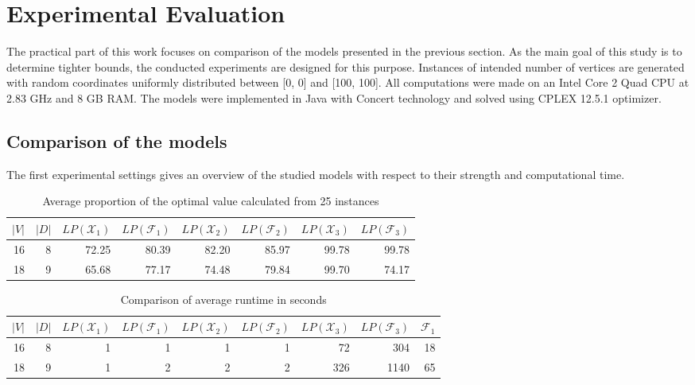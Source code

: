 \section{Experimental Evaluation}
\label{sec:exp}

The practical part of this work focuses on comparison of the models presented in the previous section.
As the main goal of this study is to determine tighter bounds, the conducted experiments are designed for this purpose.
Instances of intended number of vertices are generated with random coordinates uniformly distributed between [0, 0] and [100, 100].
All computations were made on an Intel Core 2 Quad CPU at 2.83 GHz and 8 GB RAM.
The models were implemented in Java with Concert technology and solved using CPLEX 12.5.1 optimizer.
 
\subsection{Comparison of the models}

The first experimental settings gives an overview of the studied models with respect to their strength and computational time.

\begin{table}[h!]
\centering
\setlength{\tabcolsep}{6pt} %
\renewcommand{\arraystretch}{1.4} %
\begin{tabular}{rrrrrrrr}
$|V|$ & $|D|$ & $LP(\mathcal{X}_1)$ & $LP(\mathcal{F}_1)$ & $LP(\mathcal{X}_2)$ & $LP(\mathcal{F}_2)$ & $LP(\mathcal{X}_3)$ &$LP(\mathcal{F}_3)$\\\hline
  16 & 8       & 72.25  & 80.39  & 82.20    & 85.97    & 99.78  & 99.78\\
  18 & 9       & 65.68  & 77.17  & 74.48    & 79.84    & 99.70  & 74.17\\ 
\end{tabular}
\caption{Average proportion of the optimal value calculated from 25 instances}
\label{tab:small_inst_cost}
\end{table}

\begin{table}[h!]
\centering
\setlength{\tabcolsep}{6pt} %
\renewcommand{\arraystretch}{1.4} %
\begin{tabular}{rrrrrrrrr}
 $|V|$ & $|D|$ & $LP(\mathcal{X}_1)$ & $LP(\mathcal{F}_1)$ & $LP(\mathcal{X}_2)$ & $LP(\mathcal{F}_2)$ & $LP(\mathcal{X}_3)$ & $LP(\mathcal{F}_3)$ & $\mathcal{F}_1$\\ \hline
  16 & 8       & 1   & 1   & 1     & 1     & 72  & 304  & 18 \\
  18 & 9       & 1   & 2   & 2     & 2     & 326 & 1140 & 65 \\ 
\end{tabular}
\caption{Comparison of average runtime in seconds}
\label{tab:small_inst_time}
\end{table}

